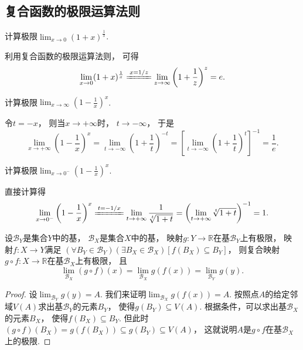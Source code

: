 \subsection{复合函数的极限运算法则}


\begin{example}
计算极限\(\lim_{x\to0} (1+x)^{\frac1x}\).
\begin{solution}
利用复合函数的极限运算法则，
可得\[
	\lim_{x\to0} (1+x)^{\frac1x}
	\xlongequal{x=1/z}
	\lim_{z\to\infty} \left(1+\frac1z\right)^z
	= e.
\]
\end{solution}
\end{example}

\begin{example}
计算极限\(\lim_{x \to \infty} \left(1 - \frac1x\right)^x\).
\begin{solution}
令\(t = -x\)，
则当\(x \to +\infty\)时，
\(t \to -\infty\)，
于是\[
	\lim_{x \to +\infty} \left(1 - \frac1x\right)^x
	= \lim_{t \to -\infty} \left(1 + \frac1t\right)^{-t}
	= \left[\lim_{t \to -\infty} \left(1 + \frac1t\right)^t\right]^{-1}
	= \frac1e.
\]
\end{solution}
\end{example}

\begin{example}
计算极限\(\lim_{x\to0^-} \left(1-\frac1x\right)^x\).
\begin{solution}
直接计算得\[
	\lim_{x\to0^-} \left(1-\frac1x\right)^x
	\xlongequal{t=-1/x} \lim_{t\to+\infty} \frac{1}{\sqrt[t]{1+t}}
	= \left(\lim_{t\to+\infty} \sqrt[t]{1+t}\right)^{-1}
	= 1.
\]
\end{solution}
\end{example}

\begin{theorem}
设\(\mathcal{B}_Y\)是集合\(Y\)中的基，
\(\mathcal{B}_X\)是集合\(X\)中的基，
映射\(g\colon Y\to\mathbb{R}\)在基\(\mathcal{B}_Y\)上有极限，
映射\(f\colon X\to Y\)满足
\((\forall B_Y\in\mathcal{B}_Y)
(\exists B_X\in\mathcal{B}_X)
[f(B_X) \subseteq B_Y]\)，
则复合映射\(g \circ f\colon X\to\mathbb{R}\)在基\(\mathcal{B}_X\)上有极限，
且\[
	\lim_{\mathcal{B}_X} (g \circ f)(x)
	= \lim_{\mathcal{B}_X} g(f(x))
	= \lim_{\mathcal{B}_Y} g(y).
\]
\begin{proof}
设\(\lim_{\mathcal{B}_Y} g(y) = A\).
我们来证明\(\lim_{\mathcal{B}_X} g(f(x)) = A\).
按照点\(A\)的给定邻域\(V(A)\)求出基\(\mathcal{B}_Y\)的元素\(B_Y\)，
使得\(g(B_Y) \subseteq V(A)\).
根据条件，可以求出基\(\mathcal{B}_X\)的元素\(B_X\)，
使得\(f(B_X) \subseteq B_Y\).
但此时\((g \circ f)(B_X) = g(f(B_X)) \subseteq g(B_Y) \subseteq V(A)\)，
这就说明\(A\)是\(g \circ f\)在基\(\mathcal{B}_X\)上的极限.
\end{proof}
\end{theorem}

